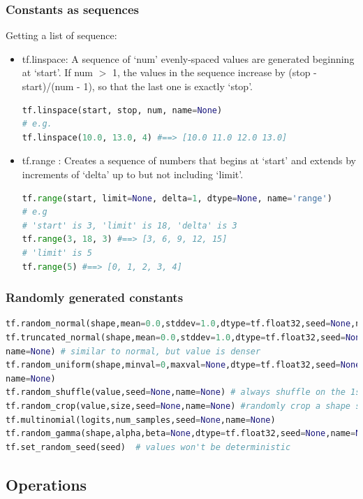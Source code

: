 \documentclass{article}
\begin{document}
	\subsubsection{Constants as sequences} 
	Getting a list of sequence:
	\begin{itemize}
	\item tf.linspace: A sequence of `num' evenly-spaced values are generated beginning at `start'. If num $>$ 1, the values in the sequence increase by (stop - start)/(num - 1), so that the last one is exactly `stop'.
\begin{lstlisting}[numbers=none, language=Python,morekeywords ={as}]
tf.linspace(start, stop, num, name=None) 
# e.g.
tf.linspace(10.0, 13.0, 4) #==> [10.0 11.0 12.0 13.0]
\end{lstlisting}
	\item tf.range : Creates a sequence of numbers that begins at `start' and extends by increments of `delta' up to but not including `limit'.
\begin{lstlisting}[numbers=none, language=Python,morekeywords ={as}]
tf.range(start, limit=None, delta=1, dtype=None, name='range')
# e.g
# 'start' is 3, 'limit' is 18, 'delta' is 3
tf.range(3, 18, 3) #==> [3, 6, 9, 12, 15]
# 'limit' is 5
tf.range(5) #==> [0, 1, 2, 3, 4]
\end{lstlisting}
	\end{itemize}

	\subsubsection{Randomly generated constants} 
\begin{lstlisting}[language=Python,morekeywords ={as}]
tf.random_normal(shape,mean=0.0,stddev=1.0,dtype=tf.float32,seed=None,name=None)
tf.truncated_normal(shape,mean=0.0,stddev=1.0,dtype=tf.float32,seed=None,
name=None) # similar to normal, but value is denser
tf.random_uniform(shape,minval=0,maxval=None,dtype=tf.float32,seed=None,
name=None)
tf.random_shuffle(value,seed=None,name=None) # always shuffle on the 1st dimension
tf.random_crop(value,size,seed=None,name=None) #randomly crop a shape size
tf.multinomial(logits,num_samples,seed=None,name=None) 
tf.random_gamma(shape,alpha,beta=None,dtype=tf.float32,seed=None,name=None)
tf.set_random_seed(seed)  # values won't be deterministic
\end{lstlisting}
	\medskip
	\subsection{Operations}
	
\end{document}
